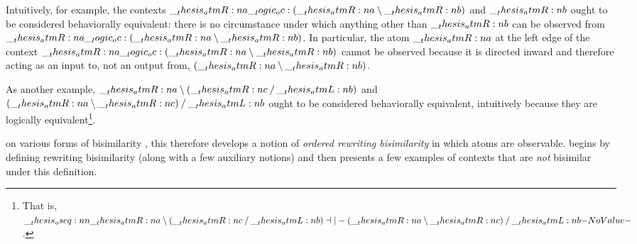 
Intuitively, for example, the contexts $\__thesis_atmR:n {a} \__logic_oc: (\__thesis_atmR:n {a} \mathbin { \setminus } \__thesis_atmR:n {b})$ and $\__thesis_atmR:n {b}$ ought to be considered behaviorally equivalent: there is no circumstance under which anything other than $\__thesis_atmR:n {b}$ can be observed from $\__thesis_atmR:n {a} \__logic_oc: (\__thesis_atmR:n {a} \mathbin { \setminus } \__thesis_atmR:n {b})$.
In particular, the atom $\__thesis_atmR:n {a}$ at the left edge of the context $\__thesis_atmR:n {a} \__logic_oc: (\__thesis_atmR:n {a} \mathbin { \setminus } \__thesis_atmR:n {b})$ cannot be observed because it is directed inward and therefore acting as an input to, not an output from, $(\__thesis_atmR:n {a} \mathbin { \setminus } \__thesis_atmR:n {b})$.

As another example, $\__thesis_atmR:n {a} \mathbin { \setminus } (\__thesis_atmR:n {c} \mathbin { / } \__thesis_atmL:n {b})$ and $(\__thesis_atmR:n {a} \mathbin { \setminus } \__thesis_atmR:n {c}) \mathbin { / } \__thesis_atmL:n {b}$ ought to be considered behaviorally equivalent, intuitively because they are logically equivalent\footnote{That is, $\oseq{\atmR{a} \limp (\atmR{c} \pmir \atmL{b}) \dashv|- (\atmR{a} \limp \atmR{c}) \pmir \atmL{b}}$.}.





 on various forms of bisimilarity%
, this  therefore develops a notion of \emph{ordered rewriting bisimilarity} in which atoms are observable.
%
 begins by defining rewriting bisimilarity (along with a few auxiliary notions) and then presents a few examples of contexts that are \emph{not} bisimilar under this definition.

